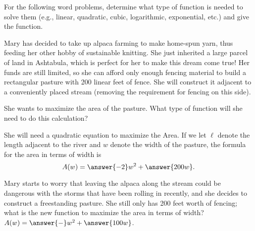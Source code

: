 \documentclass{ximera}
\author{Elizabeth Campolongo}
\begin{document}
\begin{exercise}
For the following word problems, determine what type of function is needed to solve them (e.g., linear, quadratic, cubic, logarithmic, exponential, etc.) and give the function. 

Mary has decided to take up alpaca farming to make home-spun yarn, thus feeding her other hobby of sustainable knitting. She just inherited a large parcel of land in Ashtabula, which is perfect for her to make this dream come true! Her funds are still limited, so she can afford only enough fencing material to build a rectangular pasture with 200 linear feet of fence. She will construct it adjacent to a conveniently placed stream (removing the requirement for fencing on this side). 

She wants to maximize the area of the pasture. What type of function will she need to do this calculation?\\
\begin{exercise}
She will need a quadratic equation to maximize the Area. If we let $\ell$ denote the length adjacent to the river and $w$ denote the width of the pasture, the formula for the area in terms of width is
$$A(w) = \answer{-2}w^2 + \answer{200w}.$$

\begin{exercise} %
Mary starts to worry that leaving the alpaca along the stream could be dangerous with the storms that have been rolling in recently, and she decides to construct a freestanding pasture. She still only has 200 feet worth of fencing; what is the new function to maximize the area in terms of width?\\
$A(w) = \answer{-}w^2 + \answer{100w}$.
\end{exercise}
\end{exercise}


\end{exercise}
\end{document}
